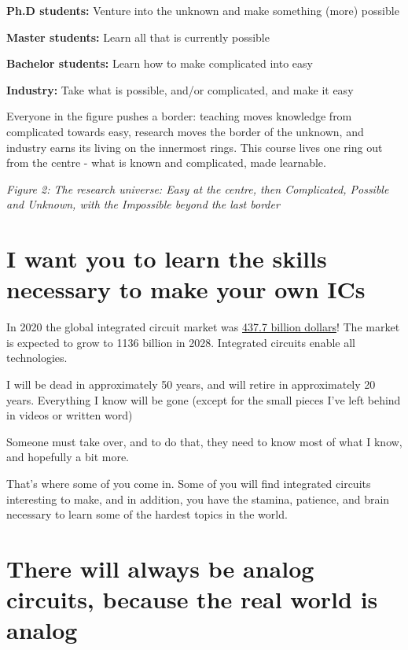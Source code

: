 \textbf{Ph.D students:} Venture into the unknown and make something
(more) possible

\textbf{Master students:} Learn all that is currently possible

\textbf{Bachelor students:} Learn how to make complicated into easy

\textbf{Industry:} Take what is possible, and/or complicated, and make
it easy

Everyone in the figure pushes a border: teaching moves knowledge from
complicated towards easy, research moves the border of the unknown, and
industry earns its living on the innermost rings. This course lives one
ring out from the centre - what is known and complicated, made
learnable.


{
\centering
{}
}

\emph{Figure 2: The research universe: Easy at the centre, then
Complicated, Possible and Unknown, with the Impossible beyond the last
border}

\section{I want you to learn the skills necessary to make your own
ICs}\label{i-want-you-to-learn-the-skills-necessary-to-make-your-own-ics}

In 2020 the global integrated circuit market was
\href{https://www.fortunebusinessinsights.com/integrated-circuit-market-106522}{437.7
billion dollars}! The market is expected to grow to 1136 billion in
2028. Integrated circuits enable all technologies.

I will be dead in approximately 50 years, and will retire in
approximately 20 years. Everything I know will be gone (except for the
small pieces I've left behind in videos or written word)

Someone must take over, and to do that, they need to know most of what I
know, and hopefully a bit more.

That's where some of you come in. Some of you will find integrated
circuits interesting to make, and in addition, you have the stamina,
patience, and brain necessary to learn some of the hardest topics in the
world.

\section{There will always be analog circuits, because the real world is
analog}\label{there-will-always-be-analog-circuits-because-the-real-world-is-analog}

